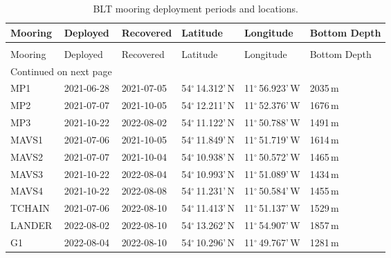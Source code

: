 \begin{longtable}{p{1.7cm}p{2.3cm}p{2.3cm}p{2.3cm}p{2.3cm}p{1.3cm}}
\caption{BLT mooring deployment periods and locations.}
\label{tab:moorings}\\
\toprule
Mooring & Deployed & Recovered & Latitude & Longitude & Bottom Depth\\
\midrule
\endfirsthead
\caption[]{BLT mooring deployment periods and locations.} \\
\toprule
Mooring & Deployed & Recovered & Latitude & Longitude & Bottom Depth\\
\midrule
\endhead
\midrule
\multicolumn{2}{r}{{Continued on next page}} \\
\midrule
\endfoot

\bottomrule
\endlastfoot
MP1     & 2021-06-28 & 2021-07-05 & 54$^{\circ}$\,14.312'\,N & 11$^{\circ}$\,56.923'\,W & 2035\,m \\
MP2     & 2021-07-07 & 2021-10-05 & 54$^{\circ}$\,12.211'\,N & 11$^{\circ}$\,52.376'\,W & 1676\,m \\
MP3     & 2021-10-22 & 2022-08-02 & 54$^{\circ}$\,11.122'\,N & 11$^{\circ}$\,50.788'\,W & 1491\,m \\
MAVS1   & 2021-07-06 & 2021-10-05 & 54$^{\circ}$\,11.849'\,N & 11$^{\circ}$\,51.719'\,W & 1614\,m \\
MAVS2   & 2021-07-07 & 2021-10-04 & 54$^{\circ}$\,10.938'\,N & 11$^{\circ}$\,50.572'\,W & 1465\,m \\
MAVS3   & 2021-10-22 & 2022-08-04 & 54$^{\circ}$\,10.993'\,N & 11$^{\circ}$\,51.089'\,W & 1434\,m \\ 
MAVS4   & 2021-10-22 & 2022-08-08 & 54$^{\circ}$\,11.231'\,N & 11$^{\circ}$\,50.584'\,W & 1455\,m \\
TCHAIN  & 2021-07-06 & 2022-08-10 & 54$^{\circ}$\,11.413'\,N & 11$^{\circ}$\,51.137'\,W & 1529\,m \\
LANDER  & 2022-08-02 & 2022-08-10 & 54$^{\circ}$\,13.262'\,N & 11$^{\circ}$\,54.907'\,W & 1857\,m \\
G1      & 2022-08-04 & 2022-08-10 & 54$^{\circ}$\,10.296'\,N & 11$^{\circ}$\,49.767'\,W & 1281\,m \\

\end{longtable}
